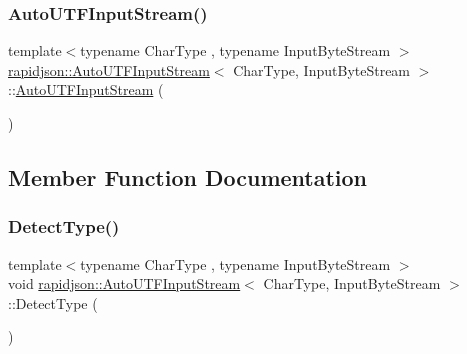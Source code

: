\subsubsection{\texorpdfstring{AutoUTFInputStream()}{AutoUTFInputStream()}\hspace{0.1cm}{\footnotesize\ttfamily [2/2]}}
{\footnotesize\ttfamily template$<$typename Char\+Type , typename Input\+Byte\+Stream $>$ \\
\mbox{\hyperlink{classrapidjson_1_1_auto_u_t_f_input_stream}{rapidjson\+::\+Auto\+U\+T\+F\+Input\+Stream}}$<$ Char\+Type, Input\+Byte\+Stream $>$\+::\mbox{\hyperlink{classrapidjson_1_1_auto_u_t_f_input_stream}{Auto\+U\+T\+F\+Input\+Stream}} (\begin{DoxyParamCaption}\item[{const \mbox{\hyperlink{classrapidjson_1_1_auto_u_t_f_input_stream}{Auto\+U\+T\+F\+Input\+Stream}}$<$ Char\+Type, Input\+Byte\+Stream $>$ \&}]{ }\end{DoxyParamCaption})\hspace{0.3cm}{\ttfamily [private]}}



\subsection{Member Function Documentation}
\mbox{\label{classrapidjson_1_1_auto_u_t_f_input_stream_a72887a6cd8306adc4140eee3ffa7df63}} 
\subsubsection{\texorpdfstring{DetectType()}{DetectType()}}
{\footnotesize\ttfamily template$<$typename Char\+Type , typename Input\+Byte\+Stream $>$ \\
void \mbox{\hyperlink{classrapidjson_1_1_auto_u_t_f_input_stream}{rapidjson\+::\+Auto\+U\+T\+F\+Input\+Stream}}$<$ Char\+Type, Input\+Byte\+Stream $>$\+::Detect\+Type (\begin{DoxyParamCaption}{ }\end{DoxyParamCaption})\hspace{0.3cm}{\ttfamily [private]}}



